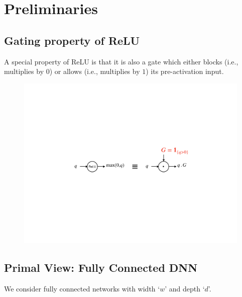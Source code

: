 \section{Preliminaries}
\subsection{Gating property of ReLU}
A special property of ReLU is that it is also a gate which either blocks (i.e., multiplies by $0$) or allows (i.e., multiplies by $1$) its pre-activation input. 
\FloatBarrier
\begin{figure}[H]
\includegraphics[scale=0.4]{figs/gating.pdf}
\end{figure}
\subsection{Primal View: Fully Connected DNN}
We consider fully connected networks with width `$w$' and depth `$d$'.
\begin{table}[h]
\centering
{}
\caption{\small{Information flow in a FC-DNN with ReLU. Here, `$q$'s are pre-activation inputs, `$z$'s are output of the hidden layers, `$G$'s are the gating values. $l\in[d-1]$ is the index of the layer, $\iout$ and $\iin$ are indices of  nodes in the current and previous layer respectively.}}
\label{tb:basic}
\end{table}

